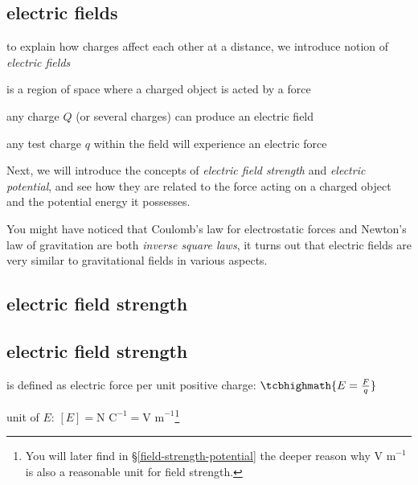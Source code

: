 
\subsection{electric fields}

to explain how charges affect each other at a distance, we introduce notion of \emph{electric fields}

\begin{ilight}
	 is a region of space where a charged object is acted by a force
\end{ilight}

any charge $Q$ (or several charges) can produce an electric field

any test charge $q$ within the field will experience an electric force

\vspace*{\baselineskip}

Next, we will introduce the concepts of \emph{electric field strength} and \emph{electric potential}, and see how they are related to the force acting on a charged object and the potential energy it possesses.

You might have noticed that Coulomb's law for electrostatic forces and Newton's law of gravitation are both \emph{inverse square laws}, it turns out that electric fields are very similar to gravitational fields in various aspects.



\subsection{electric field strength}

\subsection{electric field strength}

\rcyskip

\begin{ilight}
	 is defined as electric force per unit positive charge: $\tcbhighmath{E=\frac{F}{q}}$
\end{ilight}

\cmt unit of $E$: $[E]=\text{N C}^{-1} = \text{V m}^{-1}$\footnote{You will later find in \S\ref{field-strength-potential} the deeper reason why $\text{V m}^{-1}$ is also a reasonable unit for field strength.}

